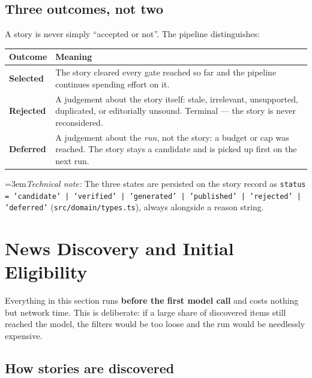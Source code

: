 \documentclass[11pt,a4paper]{article}
\newcommand{\file}[1]{\textcolor{aitkGray}{\texttt{\footnotesize\hyphenpenalty=0\exhyphenpenalty=0\relax #1}}}
\newcommand{\brk}{\hyphenpenalty=0\exhyphenpenalty=0\relax}
\newcommand{\code}[1]{\texttt{\small\brk #1}}
\newcommand{\technote}[1]{\par\vspace{-0.25em}\begingroup\footnotesize\color{aitkGray}\sloppy\emergencystretch=3em\textit{Technical note:} #1\par\endgroup}
\begin{document}
\subsection{Three outcomes, not two}

A story is never simply ``accepted or not''. The pipeline distinguishes:

\begin{center}
\small
\begin{tabularx}{\textwidth}{@{}l>{\RaggedRight}X@{}}
\toprule
\textbf{Outcome} & \textbf{Meaning} \\
\midrule
\textcolor{aitkGo}{\textbf{Selected}} &
  The story cleared every gate reached so far and the pipeline continues spending
  effort on it. \\
\textcolor{aitkStop}{\textbf{Rejected}} &
  A judgement about the story itself: stale, irrelevant, unsupported, duplicated,
  or editorially unsound. Terminal --- the story is never reconsidered. \\
\textcolor{aitkHold}{\textbf{Deferred}} &
  A judgement about the \emph{run}, not the story: a budget or cap was reached.
  The story stays a candidate and is picked up first on the next run. \\
\bottomrule
\end{tabularx}
\end{center}

\technote{The three states are persisted on the story record as
\code{status = 'candidate' | 'verified' | 'generated' | 'published' | 'rejected' | 'deferred'}
(\file{src/domain/types.ts}), always alongside a reason string.}

\section{News Discovery and Initial Eligibility}

Everything in this section runs \textbf{before the first model call} and costs
nothing but network time. This is deliberate: if a large share of discovered
items still reached the model, the filters would be too loose and the run would
be needlessly expensive.

\subsection{How stories are discovered}
\end{document}
